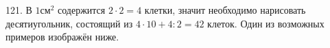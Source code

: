 121. В $1\text{см}^2$ содержится $2\cdot2=4$ клетки, значит необходимо нарисовать десятиугольник, состоящий из $4\cdot10+4:2=42$ клеток. Один из возможных примеров изображён ниже.
\begin{center}
\begin{figure}[ht!]
\end{figure}
\end{center}
